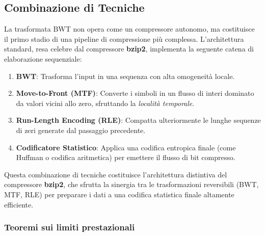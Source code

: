 \subsection{Combinazione di Tecniche}
La trasformata BWT non opera come un compressore autonomo, ma costituisce il primo stadio di una pipeline di compressione più complessa. L'architettura standard, resa celebre dal compressore \textbf{bzip2}, implementa la seguente catena di elaborazione sequenziale:

\begin{enumerate}
    \item \textbf{BWT}: Trasforma l'input in una sequenza con alta omogeneità locale.
    \item \textbf{Move-to-Front (MTF)}: Converte i simboli in un flusso di interi dominato da valori vicini allo zero, sfruttando la \textit{località temporale}.
    \item \textbf{Run-Length Encoding (RLE)}: Compatta ulteriormente le lunghe sequenze di zeri generate dal passaggio precedente.
    \item \textbf{Codificatore Statistico}: Applica una codifica entropica finale (come Huffman o codifica aritmetica) per emettere il flusso di bit compresso.
\end{enumerate}
Questa combinazione di tecniche costituisce l'architettura distintiva del compressore \textbf{bzip2}, che sfrutta la sinergia tra le trasformazioni reversibili (BWT, MTF, RLE) per preparare i dati a una codifica statistica finale altamente efficiente.
\subsubsection{Teoremi sui limiti prestazionali}
